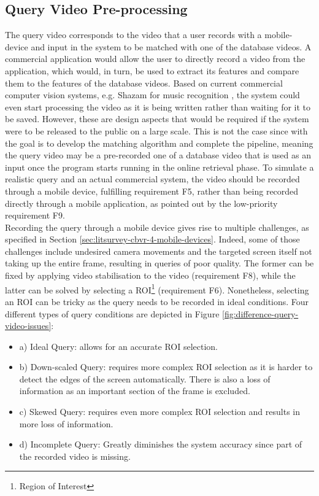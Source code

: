 \subsection{Query Video Pre-processing}

The query video corresponds to the video that a user records with a mobile-device and input in the system to be matched with one of the database videos. A commercial application would allow the user to directly record a video from the application, which would, in turn, be used to extract its features and compare them to the features of the database videos. Based on current commercial computer vision systems, e.g. Shazam for music recognition \cite{shazam}, the system could even start processing the video as it is being written rather than waiting for it to be saved. However, these are design aspects that would be required if the system were to be released to the public on a large scale. This is not the case since with the goal is to develop the matching algorithm and complete the pipeline, meaning the query video may be a pre-recorded one of a database video that is used as an input once the program starts running in the online retrieval phase. To simulate a realistic query and an actual commercial system, the video should be recorded through a mobile device, fulfilling requirement F5, rather than being recorded directly through a mobile application, as pointed out by the low-priority requirement F9.\\

Recording the query through a mobile device gives rise to multiple challenges, as specified in Section \ref{sec:litsurvey-cbvr-4-mobile-devices}. Indeed, some of those challenges include undesired camera movements and the targeted screen itself not taking up the entire frame, resulting in queries of poor quality. The former can be fixed by applying video stabilisation to the video (requirement F8), while the latter can be solved by selecting a ROI\footnote{Region of Interest} (requirement F6). Nonetheless, selecting an ROI can be tricky as the query needs to be recorded in ideal conditions. Four different types of query conditions are depicted in Figure \ref{fig:difference-query-video-issues}:
\begin{itemize}
    \item a) Ideal Query: allows for an accurate ROI selection.
    \item b) Down-scaled Query: requires more complex ROI selection as it is harder to detect the edges of the screen automatically. There is also a loss of information as an important section of the frame is excluded.
    \item c) Skewed Query: requires even more complex ROI selection and results in more loss of information.
    \item d) Incomplete Query: Greatly diminishes the system accuracy since part of the recorded video is missing.
\end{itemize}

